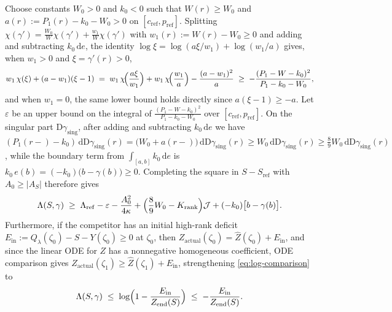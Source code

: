 \documentclass[11pt]{article}
\numberwithin{equation}{section}
\theoremstyle{plain}
\theoremstyle{definition}
\newcommand{\1}{\mathbf{1}}
\newcommand{\calJ}{\mathcal{J}}
\begin{document}
Choose constants $W_0 > 0$ and $k_0 < 0$ such that $W(r) \ge W_0$ and $a(r) := P_1(r) - k_0 - W_0 > 0$ on $[c_{\mathrm{ref}}, p_{\mathrm{ref}}]$. Splitting $\chi(\gamma') = \frac{W_0}{W}\chi(\gamma') + \frac{w_1}{W}\chi(\gamma')$ with $w_1(r) := W(r) - W_0 \ge 0$ and adding and subtracting $k_0\,\mathrm{d}e$, the identity $\log\xi = \log(a\xi/w_1) + \log(w_1/a)$ gives, when $w_1 > 0$ and $\xi = \gamma'(r) > 0$,
\[
  w_1\,\chi(\xi) + (a - w_1)(\xi - 1)
  \;=\; w_1\,\chi\!\Bigl(\frac{a\xi}{w_1}\Bigr) + w_1\,\chi\!\Bigl(\frac{w_1}{a}\Bigr) - \frac{(a - w_1)^2}{a}
  \;\ge\; -\frac{(P_1 - W - k_0)^2}{P_1 - k_0 - W_0},
\]
and when $w_1 = 0$, the same lower bound holds directly since $a(\xi - 1) \ge -a$. Let $\varepsilon$ be an upper bound on the integral of $\frac{(P_1 - W - k_0)^2}{P_1 - k_0 - W_0}$ over $[c_{\mathrm{ref}}, p_{\mathrm{ref}}]$. On the singular part $\mathrm{D}\gamma_{\mathrm{sing}}$, after adding and subtracting $k_0\,\mathrm{d}e$ we have $(P_1(r-) - k_0)\,\mathrm{d}\mathrm{D}\gamma_{\mathrm{sing}}(r) = \bigl(W_0 + a(r-)\bigr)\,\mathrm{d}\mathrm{D}\gamma_{\mathrm{sing}}(r) \ge W_0\,\mathrm{d}\mathrm{D}\gamma_{\mathrm{sing}}(r) \ge \frac{8}{9}W_0\,\mathrm{d}\mathrm{D}\gamma_{\mathrm{sing}}(r)$, while the boundary term from $\int_{[a, b]} k_0\,\mathrm{d}e$ is $k_0\,e(b) = (-k_0)\bigl(b - \gamma(b)\bigr) \ge 0$. Completing the square in $S - S_{\mathrm{ref}}$ with $A_0 \ge |A_S|$ therefore gives
\begin{equation}
  \Lambda(S, \gamma) \;\ge\; \Lambda_{\mathrm{ref}} - \varepsilon - \frac{A_0^2}{4\kappa} + \Bigl(\frac{8}{9}W_0 - K_{\mathrm{rank}}\Bigr)\calJ + (-k_0)\bigl[b-\gamma(b)\bigr].
  \label{eq:coercive-master}
\end{equation}
Furthermore, if the competitor has an initial high-rank deficit $E_{\mathrm{in}} := Q_\lambda(\zeta_0) - S - Y(\zeta_0) \ge 0$ at $\zeta_0$, then $Z_{\mathrm{actual}}(\zeta_0) = \widehat{Z}(\zeta_0) + E_{\mathrm{in}}$, and since the linear ODE for $Z$ has a nonnegative homogeneous coefficient, ODE comparison gives $Z_{\mathrm{actual}}(\zeta_1) \ge \widehat{Z}(\zeta_1) + E_{\mathrm{in}}$, strengthening \cref{eq:log-comparison} to
\[
  \Lambda(S, \gamma) \;\le\; \log\Bigl(1 - \frac{E_{\mathrm{in}}}{Z_{\mathrm{end}}(S)}\Bigr) \;\le\; -\frac{E_{\mathrm{in}}}{Z_{\mathrm{end}}(S)}.
\]
\end{document}
